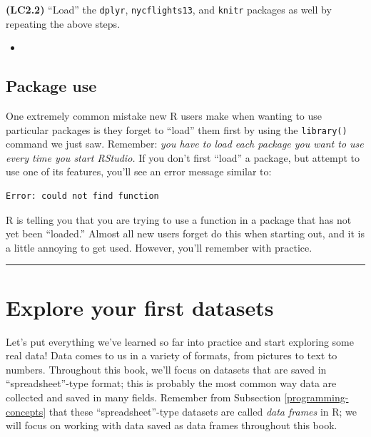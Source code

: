 \documentclass[12pt, krantz2,]{krantz}
\newenvironment{rmdblock}[1]
  {\begin{shaded*}
  \begin{itemize}
  \renewcommand{\labelitemi}{
    \raisebox{-.7\height}[0pt][0pt]{
    }
  }
  \item
  }
  {
  \end{itemize}
  \end{shaded*}
  }
\newenvironment{learncheck}
  {\begin{rmdblock}{warning}}
  {\end{rmdblock}}
\begin{document}
\textbf{(LC2.2)} ``Load'' the \texttt{dplyr}, \texttt{nycflights13}, and \texttt{knitr} packages as well by repeating the above steps.

\begin{learncheck}

\end{learncheck}

\hypertarget{package-use}{%
\subsection{Package use}\label{package-use}}

One extremely common mistake new R users make when wanting to use particular packages is they forget to ``load'' them first by using the \texttt{library()} command we just saw. Remember: \emph{you have to load each package you want to use every time you start RStudio.} If you don't first ``load'' a package, but attempt to use one of its features, you'll see an error message similar to:

\begin{verbatim}
Error: could not find function
\end{verbatim}

R is telling you that you are trying to use a function in a package that has not yet been ``loaded.'' Almost all new users forget do this when starting out, and it is a little annoying to get used. However, you'll remember with practice.

\begin{center}\rule{0.5\linewidth}{\linethickness}\end{center}

\hypertarget{nycflights13}{%
\section{Explore your first datasets}\label{nycflights13}}

Let's put everything we've learned so far into practice and start exploring some real data! Data comes to us in a variety of formats, from pictures to text to numbers. Throughout this book, we'll focus on datasets that are saved in ``spreadsheet''-type format; this is probably the most common way data are collected and saved in many fields. Remember from Subsection \ref{programming-concepts} that these ``spreadsheet''-type datasets are called \emph{data frames} in R; we will focus on working with data saved as data frames throughout this book.
\end{document}
